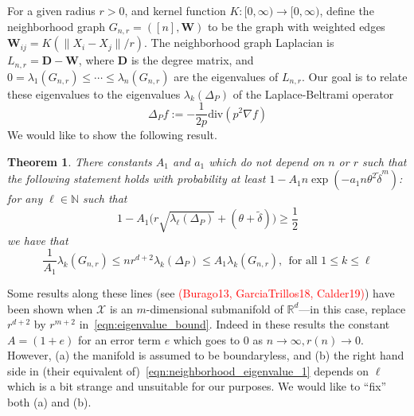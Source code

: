 \documentclass{article}
\newcommand{\Reals}{\mathbb{R}}
\newcommand{\1}{\mathbf{1}}
\newcommand{\Lap}{L}
\newcommand{\Xset}{\mathcal{X}}
\newcommand{\dive}{\mathrm{div}}
\newcommand{\wt}[1]{\widetilde{#1}}
\theoremstyle{alden}
\theoremstyle{aldenthm}
\newtheorem{theorem}{Theorem}
\theoremstyle{definition}
\theoremstyle{remark}
\begin{document}
For a given radius $r > 0$, and kernel function $K: [0,\infty) \to [0,\infty)$, define the neighborhood graph $G_{n,r} = ([n],\mathbf{W})$ to be the graph with weighted edges $\mathbf{W}_{ij} = K(\|X_i - X_j\|/r)$. The neighborhood graph Laplacian is $\Lap_{n,r} = \mathbf{D} - \mathbf{W}$, where $\mathbf{D}$ is the degree matrix, and $0 = \lambda_1(G_{n,r}) \leq \cdots \leq \lambda_n(G_{n,r})$ are the eigenvalues of $\Lap_{n,r}$. Our goal is to relate these eigenvalues to the eigenvalues $\lambda_k(\Delta_P)$ of the Laplace-Beltrami operator
\begin{equation*}
\Delta_{P}f  := -\frac{1}{2p} \dive(p^2 \nabla f)
\end{equation*}
We would like to show the following result.
\begin{theorem}
	\label{thm:neighborhood_eigenvalue}
	There constants $A_1$ and $a_1$ which do not depend on $n$ or $r$ such that the following statement holds with probability at least $1 - A_1n\exp(-a_1n\theta^2\wt{\delta}^{m})$: for any $\ell \in \mathbb{N}$ such that
	\begin{equation}
	\label{eqn:neighborhood_eigenvalue_1}
	1 - A_1\Biggl(r \sqrt{\lambda_{\ell}(\Delta_P)} + (\theta + \wt{\delta})\Biggr)  \geq \frac{1}{2}
	\end{equation}
	we have that
	\begin{equation}
	\label{eqn:eigenvalue_bound}
	\frac{1}{A_1} \lambda_k(G_{n,r}) \leq nr^{d+2} \lambda_k(\Delta_P) \leq A_1 \lambda_k(G_{n,r}),~~\textrm{for all $1 \leq k \leq \ell$}
	\end{equation}
\end{theorem}
Some results along these lines (see \textcolor{red}{(Burago13, GarciaTrillos18, Calder19)}) have been shown when $\Xset$ is an $m$-dimensional submanifold of $\Reals^d$---in this case, replace $r^{d + 2}$ by $r^{m+2}$ in~\eqref{eqn:eigenvalue_bound}. Indeed in these results the constant $A = (1 + e)$ for an error term $e$ which goes to $0$ as $n \to \infty, r(n) \to 0$. However, (a) the manifold is assumed to be boundaryless, and (b) the right hand side in (their equivalent of)~\eqref{eqn:neighborhood_eigenvalue_1} depends on $\ell$ which is a bit strange and unsuitable for our purposes. We would like to ``fix'' both (a) and (b). 
 
\end{document}
